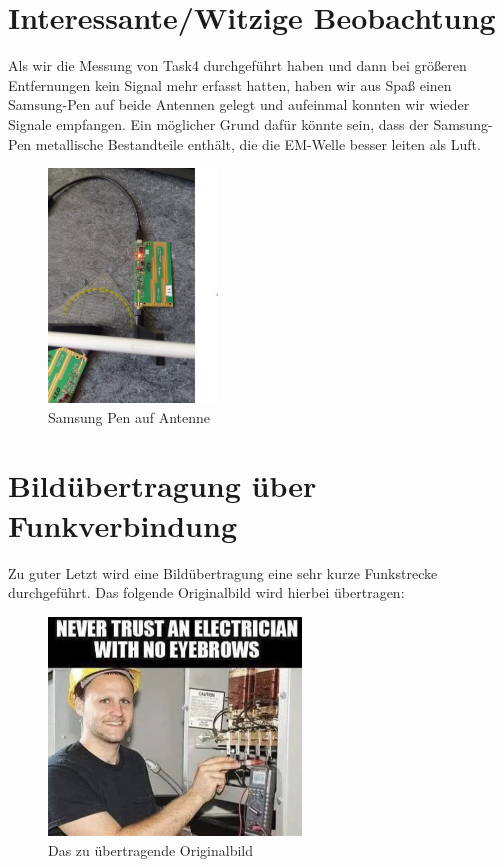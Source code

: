\section{Interessante/Witzige Beobachtung}
Als wir die Messung von Task4 durchgeführt haben und dann bei größeren Entfernungen kein Signal mehr erfasst hatten,
haben wir aus Spaß einen Samsung-Pen auf beide Antennen gelegt und aufeinmal konnten wir wieder Signale empfangen.
Ein möglicher Grund dafür könnte sein, dass der Samsung-Pen metallische Bestandteile enthält,
die die EM-Welle besser leiten als Luft.

\begin{figure}[H]
    \centering
    \includegraphics[width=0.4\textwidth]{Pictures/stift.png}
    \caption{Samsung Pen auf Antenne}
\end{figure}



\section{Bildübertragung über Funkverbindung}
Zu guter Letzt wird eine Bildübertragung eine sehr kurze Funkstrecke durchgeführt. Das folgende Originalbild wird hierbei übertragen:
\begin{figure}[H]
    \centering
    \includegraphics[width=0.6\textwidth]{Pictures/meme.jpg}
    \caption{Das zu übertragende Originalbild}
    \label{fig:Task2b}
\end{figure}

